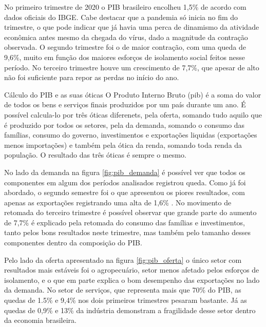 \par No primeiro trimestre de 2020 o PIB brasileiro encolheu 1,5\% de acordo com dados oficiais do IBGE. Cabe destacar que a pandemia só inicia no fim do trimestre, o que pode indicar que já havia uma perca de dinamismo da atividade econômica antes mesmo da chegada do vírus, dado a magnitude da contração observada. O segundo trimestre foi o de maior contração, com uma queda de 9,6\%, muito em função dos maiores esforços de isolamento social feitos nesse período. No terceiro trimestre houve um crescimento de 7,7\%, que apesar de alto não foi suficiente para repor as perdas no início do ano.
\begin{smbox}[label={labelbox},nameref={Cálculo do PIB e as suas óticas}]{Cálculo do PIB e as suas óticas}
	O Produto Interno Bruto (\acrshort{pib}) é a soma do valor de todos os bens e serviços finais produzidos por um país durante um ano. É possível calcula-lo por três óticas diferenets, pela oferta, somando tudo aquilo que é produzido por todos os setores, pela da demanda, somando o consumo das famílias, consumo do governo, investimentos e exportações liquidas (exportações menos importações) e também pela ótica da renda, somando toda renda da população. O resultado das três óticas é sempre o mesmo.
\end{smbox} 
\par No lado da demanda na figura \ref{fig:pib_demanda} é possível ver que todos os componentes em algum dos períodos analisados registrou queda. Como já foi abordado, o segundo semestre foi o que apresentou os piores resultados, com apenas as exportações registrando uma alta de 1,6\% . No movimento de retomada do terceiro trimestre é possível observar que grande parte do aumento de 7,7\% é explicado pela retomada do consumo das famílias e investimentos, tanto pelos bons resultados neste trimestre, mas também pelo tamanho desses componentes dentro da composição do PIB.
\par Pelo lado da oferta apresentado na figura \ref{fig:pib_oferta} o único setor com resultados mais estáveis foi o agropecuário, setor menos afetado pelos esforços de isolamento, e o que em parte explica o bom desempenho das exportações no lado da demanda. No setor de serviços, que representa mais que 70\% do PIB, as quedas de 1.5\% e 9,4\% nos dois primeiros trimestres pesaram bastante. Já as quedas de 0,9\% e 13\% da indústria demonstram a fragilidade desse setor dentro da economia brasileira.
